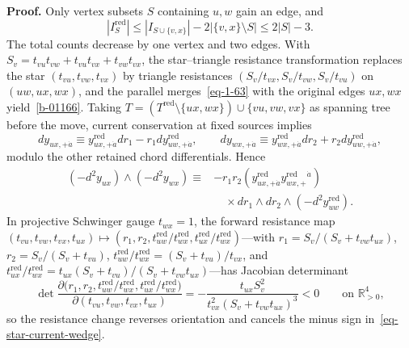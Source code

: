 \documentclass[11pt]{article}
\numberwithin{equation}{section}
\numberwithin{figure}{section}
\numberwithin{table}{section}
\begin{document}
\begin{proofbox}
\textbf{Proof.} Only vertex subsets $S$ containing $u,w$ gain an edge, and
\begin{equation}\label{eq-star-laman-count}
|I_S^{\mathrm{red}}|
\le |I_{S\cup\{v,x\}}|-2|\{v,x\}\setminus S|
\le2|S|-3.
\end{equation}
The total counts decrease by one vertex and two edges.
With $S_v=t_{vu}t_{vw}+t_{vu}t_{vx}+t_{vw}t_{vx}$, the star--triangle resistance transformation replaces the star $(t_{vu},t_{vw},t_{vx})$ by triangle resistances $(S_v/t_{vx},S_v/t_{vw},S_v/t_{vu})$ on $(uw,ux,wx)$, and the parallel merges~\eqref{eq-1-63} with the original edges $ux,wx$ yield~\eqref{b-01166}. Taking $T=(T^{\mathrm{red}}\setminus\{ux,wx\})\cup\{vu,vw,vx\}$ as spanning tree before the move, current conservation at fixed sources implies
\begin{equation}
dy_{ux,+\dot a}
\equiv y_{ux,+\dot a}^{\mathrm{red}}dr_1
-r_1dy_{uw,+\dot a}^{\mathrm{red}},\qquad
dy_{wx,+\dot a}
\equiv y_{wx,+\dot a}^{\mathrm{red}}dr_2
+r_2dy_{uw,+\dot a}^{\mathrm{red}},
\end{equation}
modulo the other retained chord differentials. Hence
\begin{equation}
\begin{aligned}
(-d^2y_{ux})\wedge(-d^2y_{wx})
\equiv{}&-r_1r_2
(y_{ux,+\dot a}^{\mathrm{red}}y_{wx,+}^{\mathrm{red}}{}^{\dot a})\\
&\quad\times dr_1\wedge dr_2\wedge(-d^2y_{uw}^{\mathrm{red}}).
\end{aligned}
\label{eq-star-current-wedge}
\end{equation}
In projective Schwinger gauge $t_{wx}=1$, the forward resistance map $(t_{vu},t_{vw},t_{vx},t_{ux})\mapsto(r_1,r_2,t_{uw}^{\mathrm{red}}/t_{wx}^{\mathrm{red}},t_{ux}^{\mathrm{red}}/t_{wx}^{\mathrm{red}})$---with $r_1=S_v/(S_v+t_{vw}t_{ux})$, $r_2=S_v/(S_v+t_{vu})$, $t_{uw}^{\mathrm{red}}/t_{wx}^{\mathrm{red}}=(S_v+t_{vu})/t_{vx}$, and $t_{ux}^{\mathrm{red}}/t_{wx}^{\mathrm{red}}=t_{ux}(S_v+t_{vu})/(S_v+t_{vw}t_{ux})$---has Jacobian determinant
\begin{equation*}
\det\frac{\partial\bigl(r_1,r_2,t_{uw}^{\mathrm{red}}/t_{wx}^{\mathrm{red}},t_{ux}^{\mathrm{red}}/t_{wx}^{\mathrm{red}}\bigr)}{\partial(t_{vu},t_{vw},t_{vx},t_{ux})}=-\frac{t_{ux}S_v^2}{t_{vx}^2(S_v+t_{vw}t_{ux})^3}<0\qquad\text{on }\mathbb R_{>0}^4,
\end{equation*}
so the resistance change reverses orientation and cancels the minus sign in~\eqref{eq-star-current-wedge}.~\hfill\qedsymbol
\end{proofbox}
\end{document}
